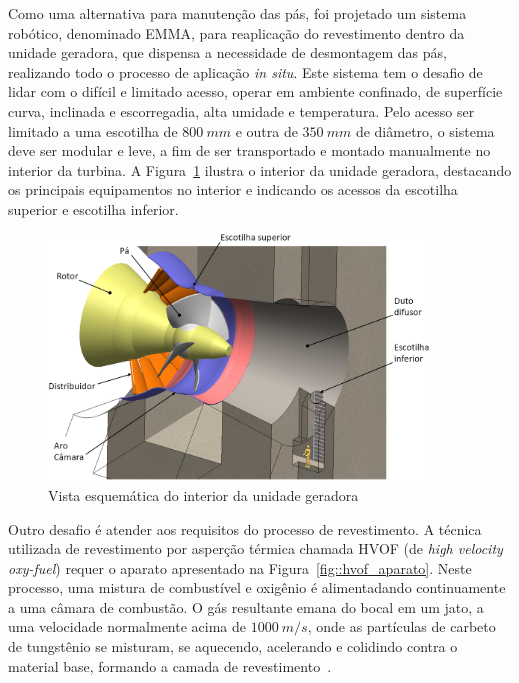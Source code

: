 Como uma alternativa para manutenção das pás, foi projetado um sistema robótico,
denominado EMMA, para reaplicação do revestimento dentro da unidade geradora,
que dispensa a necessidade de desmontagem das pás, realizando todo o processo de
aplicação \textit{in situ}. Este sistema tem o desafio de lidar com o difícil
e limitado acesso, operar em ambiente confinado, de superfície curva, inclinada
e escorregadia, alta umidade e temperatura. Pelo acesso ser limitado a uma
escotilha de $800~mm$ e outra de $350~mm$ de diâmetro, o sistema deve ser
modular e leve, a fim de ser transportado e montado manualmente no interior da
turbina. A Figura~\ref{fig::turbina_ug} ilustra o interior da unidade geradora,
destacando os principais equipamentos no interior e indicando os acessos da
escotilha superior e escotilha inferior.

\begin{figure}[h]
	\centering 
 	\includegraphics[width=0.90\textwidth]{figs/turbina_ug}
 	\caption{Vista esquemática do interior da unidade geradora}
 	\label{fig::turbina_ug}
\end{figure}

Outro desafio é atender aos requisitos do processo de revestimento. A técnica
utilizada de revestimento por asperção térmica chamada HVOF (de \textit{high
velocity oxy-fuel}) requer o aparato apresentado na
Figura~\ref{fig::hvof_aparato}. Neste processo, uma mistura de combustível e
oxigênio é alimentadando continuamente a uma câmara de combustão. O gás
resultante emana do bocal em um jato, a uma velocidade normalmente acima de
$1000~m/s$, onde as partículas de carbeto de tungstênio se misturam, se
aquecendo, acelerando e colidindo contra o material base, formando a camada de
revestimento~\cite{kuroda2008warm}.

